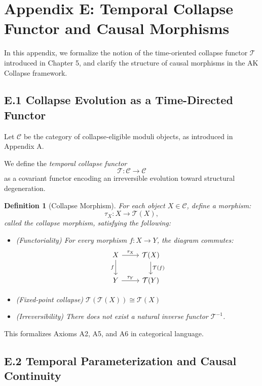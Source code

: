 \documentclass[11pt]{article}
\newtheorem{definition}[theorem]{Definition}
\begin{document}
\section*{Appendix E: Temporal Collapse Functor and Causal Morphisms}

In this appendix, we formalize the notion of the time-oriented collapse functor $\mathcal{T}$  
introduced in Chapter 5, and clarify the structure of causal morphisms in the AK Collapse framework.

\subsection*{E.1 Collapse Evolution as a Time-Directed Functor}

Let $\mathcal{C}$ be the category of collapse-eligible moduli objects, as introduced in Appendix A.

We define the \emph{temporal collapse functor}
\[
\mathcal{T} : \mathcal{C} \to \mathcal{C}
\]
as a covariant functor encoding an irreversible evolution toward structural degeneration.

\begin{definition}[Collapse Morphism]
For each object $X \in \mathcal{C}$, define a morphism:
\[
\tau_X : X \longrightarrow \mathcal{T}(X),
\]
called the \emph{collapse morphism}, satisfying the following:
\begin{itemize}
    \item (Functoriality) For every morphism $f : X \to Y$, the diagram commutes:
    \[
    \begin{tikzcd}
    X \arrow[r, "\tau_X"] \arrow[d, "f"'] & \mathcal{T}(X) \arrow[d, "\mathcal{T}(f)"] \\
    Y \arrow[r, "\tau_Y"] & \mathcal{T}(Y)
    \end{tikzcd}
    \]
    \item (Fixed-point collapse) $\mathcal{T}(\mathcal{T}(X)) \cong \mathcal{T}(X)$
    \item (Irreversibility) There does not exist a natural inverse functor $\mathcal{T}^{-1}$.
\end{itemize}
\end{definition}

This formalizes Axioms A2, A5, and A6 in categorical language.

\subsection*{E.2 Temporal Parameterization and Causal Continuity}
\end{document}
